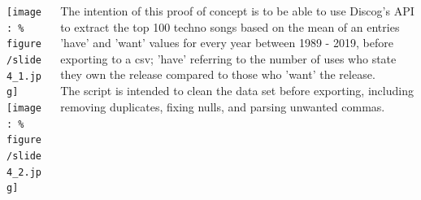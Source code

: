 \documentclass[unknownkeysallowed,usepdftitle=false, parskip=full]{beamer}
\newcommand{\secvariable}{nothing}
\newcommand{\mysection}[1]{\renewcommand{\secvariable}{#1}
}
\begin{document}
\mysection{Intention}
\begin{frame}\label{\secvariable}
  \begin{columns}[t]
    \begin{column}[c]{0.30\textwidth}
\texttt{[image: \%
figure/slide4\_1.jpg]}\\
\vspace{12pt}
\texttt{[image: \%
figure/slide4\_2.jpg]}
    \end{column}
    \begin{column}[c]{0.60\textwidth}
    \parbox{\linewidth}{
    The intention of this proof of concept is to be able to use Discog's API to extract the top 100 techno songs based on the mean of an entries 'have' and 'want' values for every year between 1989 - 2019, before exporting to a csv; 'have' referring to the number of uses who state they own the release compared to those who 'want' the release.\\
    The script is intended to clean the data set before exporting, including removing duplicates, fixing nulls, and parsing unwanted commas.
     }
    \end{column}
  \end{columns}
\end{frame}
\end{document}
